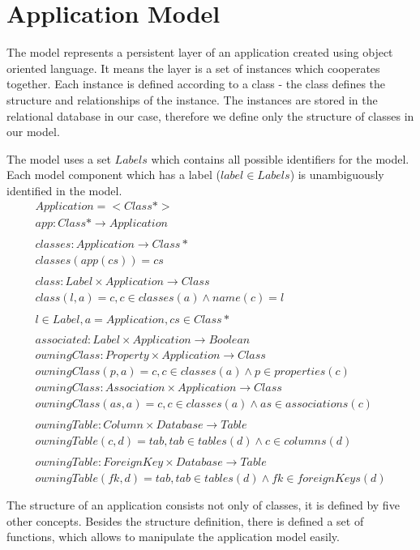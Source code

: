 \documentclass[11pt]{article}
\begin{document}
\section{Application Model}
\label{sec:appModel}
The model represents a persistent layer of an application created using object oriented language. It means the layer is a set of instances which cooperates together. Each instance is defined according to a class - the class defines the structure and relationships of the instance. The instances are stored in the relational database in our case, therefore we define only the structure of classes in our model. 

The model uses a set $Labels$ which contains all possible identifiers for the model. Each model component which has a label ($label \in Labels$) is unambiguously identified in the model.
\begin{gather*}
  Application = < Class* >
  \\ 
  app : Class* \rightarrow  Application \\ \\
  classes : Application \rightarrow Class* \\
  classes(app(cs)) = cs  \\\\
  class : Label \times Application \rightarrow Class   \\ 
  class(l, a) = c, c \in classes(a) \wedge name(c) = l \\ \\
  l \in Label, a = Application, cs \in Class* 
  \\ \\
  associated :  Label \times Application \rightarrow Boolean \\
  owningClass : Property \times Application \rightarrow Class  \\ owningClass(p, a) = c, c \in classes(a) \wedge p \in properties(c) \\
  owningClass : Association \times Application \rightarrow Class  \\
owningClass(as, a) = c, c \in classes(a) \wedge as \in associations(c) \\ \\
owningTable : Column \times Database \rightarrow Table  \\
owningTable(c, d) = tab, tab \in tables(d) \wedge c \in columns(d) \\ \\
owningTable : ForeignKey \times Database \rightarrow Table  \\
owningTable(fk, d) = tab, tab \in tables(d) \wedge fk \in foreignKeys(d)\\ \\ 
\end{gather*}
The structure of an application consists not only of classes, it is defined by five other concepts. Besides the structure definition, there is defined a set of functions, which allows to manipulate the application model easily. 
\end{document}

